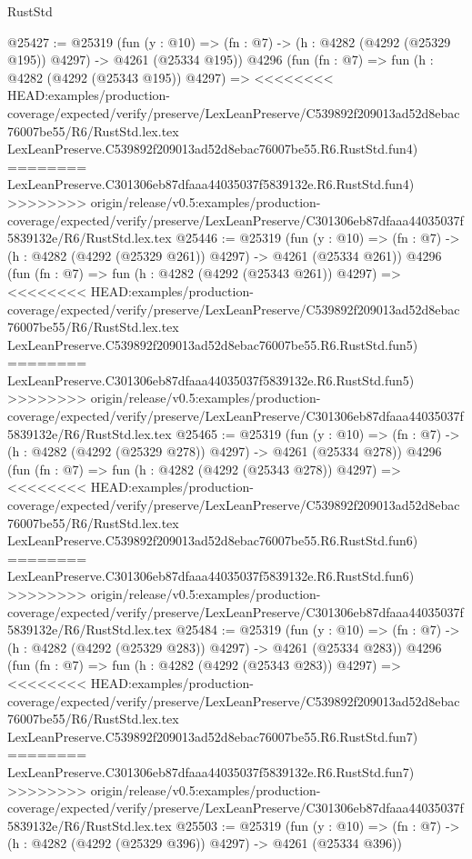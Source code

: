 \begin{lexlean}{RustStd}
\begin{coremodule}
{\begin{coremodule}
{{{{{{{{{{{{{{{{{{{{{{{{{{{{{{{{{{{@25427 := @25319
    (fun (y : @10) => (fn : @7) -> (h : @4282 (@4292 (@25329 @195)) @4297) -> @4261 (@25334 @195))
    @4296
    (fun (fn : @7) =>
    fun (h : @4282 (@4292 (@25343 @195)) @4297) =>
<<<<<<<< HEAD:examples/production-coverage/expected/verify/preserve/LexLeanPreserve/C539892f209013ad52d8ebac76007be55/R6/RustStd.lex.tex
    LexLeanPreserve.C539892f209013ad52d8ebac76007be55.R6.RustStd.fun4)
========
    LexLeanPreserve.C301306eb87dfaaa44035037f5839132e.R6.RustStd.fun4)
>>>>>>>> origin/release/v0.5:examples/production-coverage/expected/verify/preserve/LexLeanPreserve/C301306eb87dfaaa44035037f5839132e/R6/RustStd.lex.tex
@25446 := @25319
    (fun (y : @10) => (fn : @7) -> (h : @4282 (@4292 (@25329 @261)) @4297) -> @4261 (@25334 @261))
    @4296
    (fun (fn : @7) =>
    fun (h : @4282 (@4292 (@25343 @261)) @4297) =>
<<<<<<<< HEAD:examples/production-coverage/expected/verify/preserve/LexLeanPreserve/C539892f209013ad52d8ebac76007be55/R6/RustStd.lex.tex
    LexLeanPreserve.C539892f209013ad52d8ebac76007be55.R6.RustStd.fun5)
========
    LexLeanPreserve.C301306eb87dfaaa44035037f5839132e.R6.RustStd.fun5)
>>>>>>>> origin/release/v0.5:examples/production-coverage/expected/verify/preserve/LexLeanPreserve/C301306eb87dfaaa44035037f5839132e/R6/RustStd.lex.tex
@25465 := @25319
    (fun (y : @10) => (fn : @7) -> (h : @4282 (@4292 (@25329 @278)) @4297) -> @4261 (@25334 @278))
    @4296
    (fun (fn : @7) =>
    fun (h : @4282 (@4292 (@25343 @278)) @4297) =>
<<<<<<<< HEAD:examples/production-coverage/expected/verify/preserve/LexLeanPreserve/C539892f209013ad52d8ebac76007be55/R6/RustStd.lex.tex
    LexLeanPreserve.C539892f209013ad52d8ebac76007be55.R6.RustStd.fun6)
========
    LexLeanPreserve.C301306eb87dfaaa44035037f5839132e.R6.RustStd.fun6)
>>>>>>>> origin/release/v0.5:examples/production-coverage/expected/verify/preserve/LexLeanPreserve/C301306eb87dfaaa44035037f5839132e/R6/RustStd.lex.tex
@25484 := @25319
    (fun (y : @10) => (fn : @7) -> (h : @4282 (@4292 (@25329 @283)) @4297) -> @4261 (@25334 @283))
    @4296
    (fun (fn : @7) =>
    fun (h : @4282 (@4292 (@25343 @283)) @4297) =>
<<<<<<<< HEAD:examples/production-coverage/expected/verify/preserve/LexLeanPreserve/C539892f209013ad52d8ebac76007be55/R6/RustStd.lex.tex
    LexLeanPreserve.C539892f209013ad52d8ebac76007be55.R6.RustStd.fun7)
========
    LexLeanPreserve.C301306eb87dfaaa44035037f5839132e.R6.RustStd.fun7)
>>>>>>>> origin/release/v0.5:examples/production-coverage/expected/verify/preserve/LexLeanPreserve/C301306eb87dfaaa44035037f5839132e/R6/RustStd.lex.tex
@25503 := @25319
    (fun (y : @10) => (fn : @7) -> (h : @4282 (@4292 (@25329 @396)) @4297) -> @4261 (@25334 @396))
}}}}}}}}}}}}}}}}}}}}}}}}}}}}}}}}}}}
\end{coremodule}}
\end{coremodule}
\end{lexlean}
